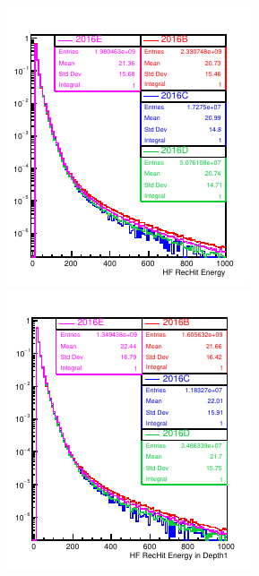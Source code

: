 \begin{figure}[!h] %
\begin{minipage}[c]{0.32\linewidth}
\centering
\includegraphics[width=0.99\linewidth]{../Figures/Chap2/ImageFiles_HF/BasicPics/Comp2016/RecHitsE2016BtoE.pdf}
\end{minipage}
\begin{minipage}[c]{0.32\linewidth}
\centering
\includegraphics[width=0.99\linewidth]{../Figures/Chap2/ImageFiles_HF/BasicPics/Comp2016/RecHitsEL2016BtoE.pdf}

\end{minipage}
\end{figure}
